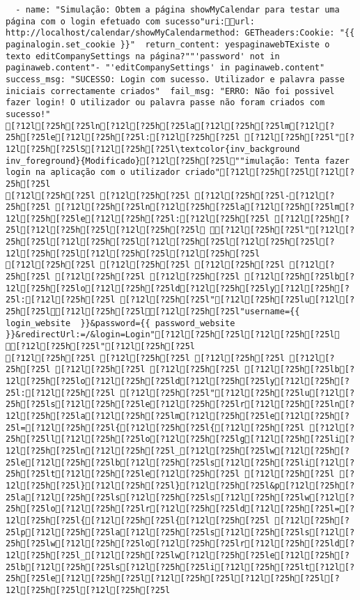 \documentclass{scrartcl}
\begin{document}
\begin{Verbatim}
  - name: "Simulação: Obtem a página showMyCalendar para testar uma página com o login efetuado com sucesso"uri:url: http://localhost/calendar/showMyCalendarmethod: GETheaders:Cookie: "{{ paginalogin.set_cookie }}"  return_content: yespaginawebTExiste o texto editCompanySettings na página?""'password' not in paginaweb.content"- "'editCompanySettings' in paginaweb.content"  success_msg: "SUCESSO: Login com sucesso. Utilizador e palavra passe iniciais correctamente criados"  fail_msg: "ERRO: Não foi possivel fazer login! O utilizador ou palavra passe não foram criados com sucesso!"
[?12l[?25h[?25ln[?12l[?25h[?25la[?12l[?25h[?25lm[?12l[?25h[?25le[?12l[?25h[?25l:[?12l[?25h[?25l [?12l[?25h[?25l"[?12l[?25h[?25lS[?12l[?25h[?25l\textcolor{inv_background inv_foreground}{Modificado}[?12l[?25h[?25l""imulação: Tenta fazer login na aplicação com o utilizador criado"[?12l[?25h[?25l[?12l[?25h[?25l
[?12l[?25h[?25l [?12l[?25h[?25l [?12l[?25h[?25l-[?12l[?25h[?25l [?12l[?25h[?25ln[?12l[?25h[?25la[?12l[?25h[?25lm[?12l[?25h[?25le[?12l[?25h[?25l:[?12l[?25h[?25l [?12l[?25h[?25l[?12l[?25h[?25l[?12l[?25h[?25l [?12l[?25h[?25l"[?12l[?25h[?25l[?12l[?25h[?25l[?12l[?25h[?25l[?12l[?25h[?25l[?12l[?25h[?25l[?12l[?25h[?25l[?12l[?25h[?25l
[?12l[?25h[?25l [?12l[?25h[?25l [?12l[?25h[?25l [?12l[?25h[?25l [?12l[?25h[?25l [?12l[?25h[?25l [?12l[?25h[?25lb[?12l[?25h[?25lo[?12l[?25h[?25ld[?12l[?25h[?25ly[?12l[?25h[?25l:[?12l[?25h[?25l [?12l[?25h[?25l"[?12l[?25h[?25lu[?12l[?25h[?25l[?12l[?25h[?25l[?12l[?25h[?25l"username={{ login_website  }}&password={{ password_website  }}&redirectUrl:=/&login=Login"[?12l[?25h[?25l[?12l[?25h[?25l [?12l[?25h[?25l"[?12l[?25h[?25l
[?12l[?25h[?25l [?12l[?25h[?25l [?12l[?25h[?25l [?12l[?25h[?25l [?12l[?25h[?25l [?12l[?25h[?25l [?12l[?25h[?25lb[?12l[?25h[?25lo[?12l[?25h[?25ld[?12l[?25h[?25ly[?12l[?25h[?25l:[?12l[?25h[?25l [?12l[?25h[?25l"[?12l[?25h[?25lu[?12l[?25h[?25ls[?12l[?25h[?25le[?12l[?25h[?25lr[?12l[?25h[?25ln[?12l[?25h[?25la[?12l[?25h[?25lm[?12l[?25h[?25le[?12l[?25h[?25l=[?12l[?25h[?25l{[?12l[?25h[?25l{[?12l[?25h[?25l [?12l[?25h[?25ll[?12l[?25h[?25lo[?12l[?25h[?25lg[?12l[?25h[?25li[?12l[?25h[?25ln[?12l[?25h[?25l_[?12l[?25h[?25lw[?12l[?25h[?25le[?12l[?25h[?25lb[?12l[?25h[?25ls[?12l[?25h[?25li[?12l[?25h[?25lt[?12l[?25h[?25le[?12l[?25h[?25l [?12l[?25h[?25l [?12l[?25h[?25l}[?12l[?25h[?25l}[?12l[?25h[?25l&p[?12l[?25h[?25la[?12l[?25h[?25ls[?12l[?25h[?25ls[?12l[?25h[?25lw[?12l[?25h[?25lo[?12l[?25h[?25lr[?12l[?25h[?25ld[?12l[?25h[?25l=[?12l[?25h[?25l{[?12l[?25h[?25l{[?12l[?25h[?25l [?12l[?25h[?25lp[?12l[?25h[?25la[?12l[?25h[?25ls[?12l[?25h[?25ls[?12l[?25h[?25lw[?12l[?25h[?25lo[?12l[?25h[?25lr[?12l[?25h[?25ld[?12l[?25h[?25l_[?12l[?25h[?25lw[?12l[?25h[?25le[?12l[?25h[?25lb[?12l[?25h[?25ls[?12l[?25h[?25li[?12l[?25h[?25lt[?12l[?25h[?25le[?12l[?25h[?25l[?12l[?25h[?25l[?12l[?25h[?25l[?12l[?25h[?25l[?12l[?25h[?25l

\end{Verbatim}
\end{document}

